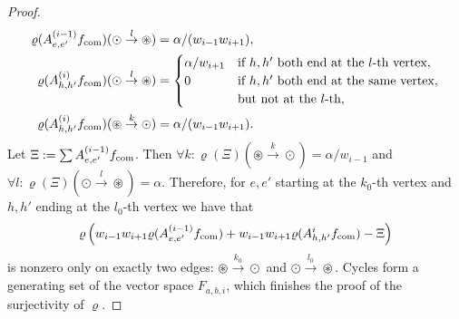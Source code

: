 \documentclass[10pt,a4paper]{article}
\newcommand{\fcom}{f_{\rm com}}
\begin{document}
\begin{proof}
\begin{align*}
\varrho(A^{(i-1)}_{e,e'}\fcom)(\odot\overset l\to\circledast)&=\alpha/(w_{i-1}w_{i+1}),\\
\varrho(A^{(i)}_{h,h'}\fcom)(\odot\overset l\to\circledast)&=\begin{cases}\alpha/w_{i+1}&\text{if }h,h'\text{ both end at the }l\text{-th vertex},\\0&\text{if }h,h'\text{ both end at the same vertex,}\\&\text{but not at the }l\text{-th},\end{cases}\\
\varrho(A^{(i)}_{h,h'}\fcom)(\circledast\overset k\to\odot)&=\alpha/(w_{i-1}w_{i+1}).
\end{align*}
Let $\Xi:=\sum A^{(i-1)}_{e,e'}\fcom$. Then $\forall k:\varrho(\Xi)(\circledast\overset k\to\odot)=\alpha/w_{i-1}$ and $\forall l:\varrho(\Xi)(\odot\overset l\to\circledast)=\alpha$. Therefore, for $e,e'$ starting at the $k_0$-th vertex and $h,h'$ ending at the $l_0$-th vertex we have that
\[\varrho\left(w_{i-1}w_{i+1}\varrho(A^{(i-1)}_{e,e'}\fcom)+w_{i-1}w_{i+1}\varrho(A^i_{h,h'}\fcom)-\Xi\right)\]
is nonzero only on exactly two edges: $\circledast\overset{k_0}\to\odot$ and $\odot\overset{l_0}\to\circledast$. Cycles form a generating set of the vector space $F_{a,b,i}$, which finishes the proof of the surjectivity of $\varrho$.
\end{proof}
\end{document}
